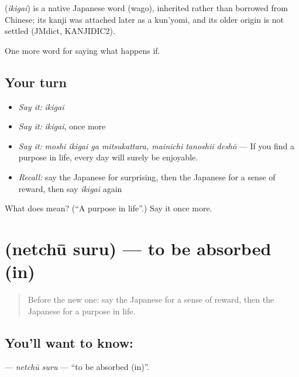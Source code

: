 \begin{cousinweb}
\textbf{} (\emph{ikigai}) is a native Japanese word (wago), inherited rather than borrowed from Chinese; its kanji was attached later as a kun'yomi, and its older origin is not settled (JMdict, KANJIDIC2).
\end{cousinweb}

\begin{grammarlens}[title={What you've built}]
One more word for saying what happens if.
\end{grammarlens}

\subsection*{Your turn}
\begin{itemize}
\raggedright
  \item \emph{Say it:} \emph{ikigai}
  \item \emph{Say it:} \emph{ikigai}, once more
  \item \emph{Say it:} \emph{moshi ikigai ga mitsukattara, mainichi tanoshii deshō} — If you find a purpose in life, every day will surely be enjoyable.
  \item \emph{Recall:} say the Japanese for surprising, then the Japanese for a sense of reward, then say \emph{ikigai} again
\end{itemize}

\begin{tcolorbox}[breakable,colback=teal!4,colframe=teal!35!black,title={Before you move on}]
What does  mean? (\textquotedblleft{}A purpose in life\textquotedblright{}.) Say it once more.
\end{tcolorbox}
\section[\texorpdfstring{\ja{ねっちゅうする} (netchū suru)}{ねっちゅうする (netchū suru)}]{ (netchū suru) — to be absorbed (in)}

\label{lesson:JA-C533-netchuu-suru}



\begin{quote}
Before the new one: say the Japanese for a sense of reward, then the Japanese for a purpose in life.
\end{quote}

\subsection*{You'll want to know: }
\textbf{} — \emph{netchū suru} — \textquotedblleft{}to be absorbed (in)\textquotedblright{}.

